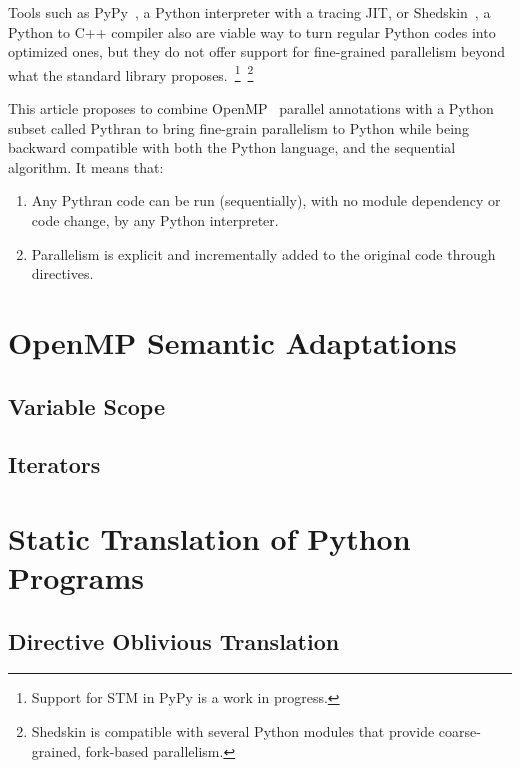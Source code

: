 \documentclass{llncs}
\begin{document}
Tools such as PyPy~\cite{pypy2009}, a Python interpreter with a tracing JIT, or
Shedskin~\cite{shedskin2006}, a Python to C++ compiler also are viable way to
turn regular Python codes into optimized ones, but they do not offer support for
fine-grained parallelism beyond what the standard library
proposes.~\footnote{Support for STM in PyPy is a work in
progress.}~\footnote{Shedskin is compatible with several Python modules that
provide coarse-grained, fork-based parallelism.}

This article proposes to combine OpenMP~\cite{openmp3.1} parallel annotations
with a Python subset called Pythran to bring fine-grain parallelism to Python
while being backward compatible with both the Python language, and the
sequential algorithm. It means that:
\begin{enumerate}
    \item Any Pythran code can be run (sequentially), with no module dependency or code change,
        by any Python interpreter.
    \item Parallelism is explicit and incrementally added to the original code
        through directives.
\end{enumerate}

\section{OpenMP Semantic Adaptations}\label{sec:python-openmp}

\subsection{Variable Scope}

\subsection{Iterators}

\section{Static Translation of Python Programs}\label{sec:python-static}

\subsection{Directive Oblivious Translation}
\end{document}
